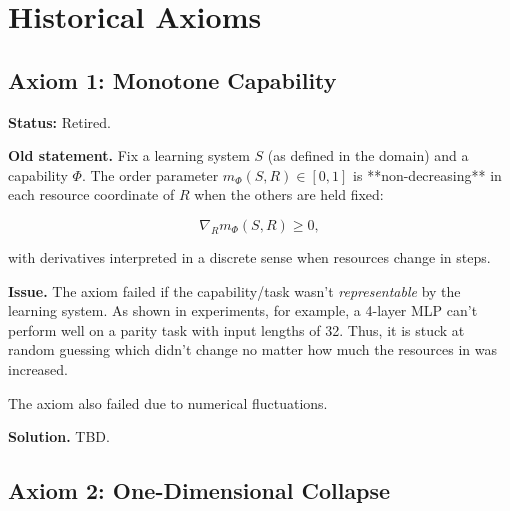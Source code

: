\documentclass[12pt]{article}
\begin{document}
\section{Historical Axioms}
\localtableofcontents
\medskip

\subsection{Axiom 1: Monotone Capability}

\begin{histaxiom}[v0.0 — 2025-08-23]
\textbf{Status:} Retired.

\textbf{Old statement.}
Fix a learning system $S$ (as defined in the domain) and a capability $\Phi$. The order parameter $m_\Phi(S,R)\in[0,1]$ is **non-decreasing** in each resource coordinate of $R$
when the others are held fixed:

\[
\nabla _{ R} m_\Phi (S,R)\ge 0,
\]

with derivatives interpreted in a discrete sense when resources change in steps.

\textbf{Issue.}
The axiom failed if the capability/task wasn't \textit{representable} by the learning system. As shown in experiments, for example, a 4-layer MLP can't perform well on a parity task with input lengths of 32. Thus, it is stuck at random guessing which didn't change no matter how much the resources in was increased. 

The axiom also failed due to numerical fluctuations.

\textbf{Solution.}
TBD.

\end{histaxiom}



\subsection{Axiom 2: One-Dimensional Collapse}

\begin{histaxiom}[Axiom 2 — v0.2 — 2025-07-22]

\end{histaxiom}
\end{document}
